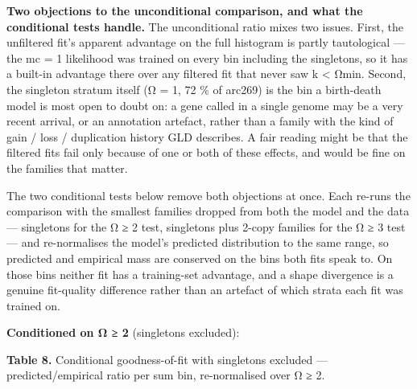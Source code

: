 \documentclass[
  10pt,
]{article}
\begin{document}
\textbf{Two objections to the unconditional comparison, and what the
conditional tests handle.} The unconditional ratio mixes two issues.
First, the unfiltered fit's apparent advantage on the full histogram is
partly tautological --- the mc = 1 likelihood was trained on every bin
including the singletons, so it has a built-in advantage there over any
filtered fit that never saw k \textless{} Ωmin. Second, the singleton
stratum itself (Ω = 1, 72 \% of arc269) is the bin a birth-death model
is most open to doubt on: a gene called in a single genome may be a very
recent arrival, or an annotation artefact, rather than a family with the
kind of gain / loss / duplication history GLD describes. A fair reading
might be that the filtered fits fail only because of one or both of
these effects, and would be fine on the families that matter.

The two conditional tests below remove both objections at once. Each
re-runs the comparison with the smallest families dropped from both the
model and the data --- singletons for the Ω ≥ 2 test, singletons plus
2-copy families for the Ω ≥ 3 test --- and re-normalises the model's
predicted distribution to the same range, so predicted and empirical
mass are conserved on the bins both fits speak to. On those bins neither
fit has a training-set advantage, and a shape divergence is a genuine
fit-quality difference rather than an artefact of which strata each fit
was trained on.

\textbf{Conditioned on Ω ≥ 2} (singletons excluded):

\textbf{Table 8.} Conditional goodness-of-fit with singletons excluded
--- predicted/empirical ratio per sum bin, re-normalised over Ω ≥ 2.
\end{document}
